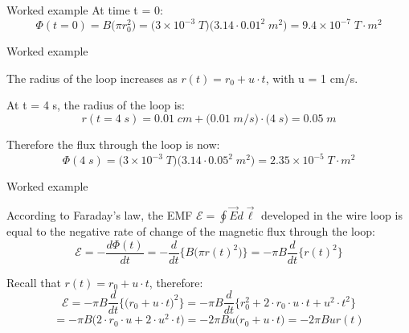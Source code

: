 {\begin{frame}{Worked example }
At time t = 0:
\begin{equation*}
   \Phi(t = 0) = B \Big( \pi r_0^2 \Big)
      = \Big( 3 \times 10^{-3} \; T \Big) \Big( 3.14  \cdot 0.01^2 \; m^2 \Big) = 9.4 \times 10^{-7} \; T \cdot m^2
\end{equation*}

\end{frame}

%
%
%

\begin{frame}{Worked example }

The radius of the loop increases as $\displaystyle r(t) = r_0 + u \cdot t$,
with u = 1 cm/s.

\vspace{0.3cm}

At t = 4 s, the radius of the loop is:
\begin{equation*}
     r(t = 4 \; s) = 0.01 \; cm + \Big(0.01 \; m/s \Big) \cdot \Big( 4 \; s \Big) = 0.05 \; m
\end{equation*}

\vspace{0.2cm}

Therefore the flux through the loop is now:
\begin{equation*}
     \Phi(4 \; s) = \Big( 3 \times 10^{-3} \; T \Big) \Big( 3.14  \cdot 0.05^2 \; m^2 \Big) = 2.35 \times 10^{-5} \; T \cdot m^2
\end{equation*}

\end{frame}

%
%
%

\begin{frame}{Worked example }

According to Faraday's law, the EMF $\displaystyle \mathcal{E} = \oint \vec{E} d\vec{\ell}$ developed in the wire loop
is equal to the negative rate of change of the magnetic flux through the loop:
\begin{equation*}
      \mathcal{E} = - \frac{d\Phi(t)}{dt} = - \frac{d}{dt} \bigg\{ B
      \Big( \pi r(t)^2\Big) \bigg\}  = - \pi B \frac{d}{dt} \bigg\{ r(t)^2 \bigg\}
\end{equation*}

Recall that $\displaystyle  r(t) = r_0 + u \cdot t$, therefore:
\begin{equation*}
      \mathcal{E}
          = - \pi B \frac{d}{dt} \bigg\{  \Big( r_0 + u \cdot t \Big)^2 \bigg\}
          = - \pi B \frac{d}{dt} \bigg\{  r_0^2 + 2 \cdot r_0 \cdot u \cdot t + u^2 \cdot t^2 \bigg\}
\end{equation*}
\begin{equation*}
      = - \pi B \Big(  2 \cdot r_0 \cdot u + 2\cdot u^2 \cdot t \Big)
      = - 2 \pi B u \Big( r_0 + u \cdot t \Big)
      = - 2 \pi B u r(t)
\end{equation*}

\end{frame}


} %


